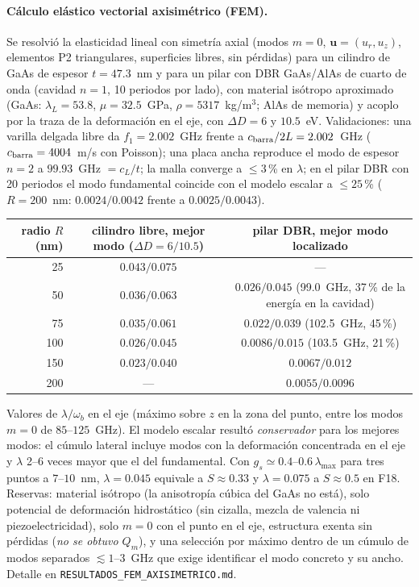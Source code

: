 \documentclass[11pt,a4paper]{article}
\newcommand{\wb}{\omega_b}
\begin{document}
\paragraph{Cálculo elástico vectorial axisimétrico (FEM).}
Se resolvió la elasticidad lineal con simetría axial (modos $m=0$, $\bm u=(u_r,u_z)$, elementos P2 triangulares, superficies libres, sin pérdidas) para un cilindro de GaAs de espesor $t=47.3$~nm y para un pilar con DBR GaAs/AlAs de cuarto de onda (cavidad $n=1$, 10 periodos por lado), con material isótropo aproximado (GaAs: $\lambda_L=53.8$, $\mu=32.5$~GPa, $\rho=5317$~kg/m$^3$; AlAs de memoria) y acoplo por la traza de la deformación en el eje, con $\Delta D=6$ y $10.5$~eV.
Validaciones: una varilla delgada libre da $f_1=2.002$~GHz frente a $c_{\rm barra}/2L=2.002$~GHz ($c_{\rm barra}=4004$~m/s con Poisson); una placa ancha reproduce el modo de espesor $n=2$ a $99.93$~GHz $=c_L/t$; la malla converge a $\le3$\,\% en $\lambda$; en el pilar DBR con 20 periodos el modo fundamental coincide con el modelo escalar a $\le25$\,\% ($R=200$~nm: $0.0024/0.0042$ frente a $0.0025/0.0043$).
\begin{center}\small
\begin{tabular}{rcc}\toprule
radio $R$ (nm) & cilindro libre, mejor modo ($\Delta D=6/10.5$) & pilar DBR, mejor modo localizado\\\midrule
25 & $0.043/0.075$ & ---\\
50 & $0.036/0.063$ & $0.026/0.045$ (99.0~GHz, 37\,\% de la energía en la cavidad)\\
75 & $0.035/0.061$ & $0.022/0.039$ (102.5~GHz, 45\,\%)\\
100 & $0.026/0.045$ & $0.0086/0.015$ (103.5~GHz, 21\,\%)\\
150 & $0.023/0.040$ & $0.0067/0.012$\\
200 & --- & $0.0055/0.0096$\\\bottomrule
\end{tabular}
\end{center}
Valores de $\lambda/\wb$ en el eje (máximo sobre $z$ en la zona del punto, entre los modos $m=0$ de $85$--$125$~GHz). El modelo escalar resultó \emph{conservador} para los mejores modos: el cúmulo lateral incluye modos con la deformación concentrada en el eje y $\lambda$ 2--6 veces mayor que el del fundamental.
Con $g_s\simeq0.4$--$0.6\,\lambda_{\max}$ para tres puntos a $7$--$10$~nm, $\lambda=0.045$ equivale a $S\approx0.33$ y $\lambda=0.075$ a $S\approx0.5$ en F18.
Reservas: material isótropo (la anisotropía cúbica del GaAs no está), solo potencial de deformación hidrostático (sin cizalla, mezcla de valencia ni piezoelectricidad), solo $m=0$ con el punto en el eje, estructura exenta sin pérdidas (\emph{no se obtuvo $Q_m$}), y una selección por máximo dentro de un cúmulo de modos separados $\lesssim1$--$3$~GHz que exige identificar el modo concreto y su ancho. Detalle en \texttt{RESULTADOS\_FEM\_AXISIMETRICO.md}.
\end{document}
